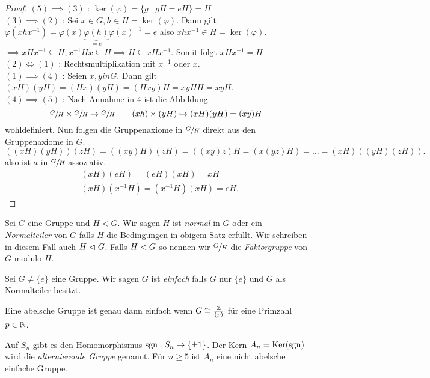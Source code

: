 \begin{proof}
	$(5) \implies (3)$ : $\ker(\varphi) = \{g \mid gH = e H\} = H$ \\
	$(3) \implies (2)$ : Sei $x \in G, h \in H = \ker(\varphi)$.
	Dann gilt $\varphi(x h x^{-1}) = \varphi(x) \underbrace{\varphi(h)}_{= e} \varphi(x)^{-1} = e$ also $x h x^{-1} \in H = \ker(\varphi)$.
	$\implies x H x^{-1} \subseteq H, x^{-1} H x \subseteq H \implies H \subseteq x H x^{-1}$. Somit folgt $x H x^{-1} = H$\\
	$(2) \Leftrightarrow (1)$ : Rechtsmultiplikation mit $x^{-1}$ oder $x$.\\
	$(1) \implies (4)$ : Seien $x,y in G$. Dann gilt $(xH)(yH) = (Hx)(yH) = (Hxy)H = xy H H = xy H$.\\
	$(4) \implies (5)$ : Nach Annahme in $4$ ist die Abbildung 
	\[
		\sfrac{G}{H} \times \sfrac{G}{H} \to \sfrac{G}{H} \qquad (xh) \times (yH) \mapsto (xH)(yH) = (xy) H
	\]
	wohldefiniert. Nun folgen die Gruppenaxiome in $\sfrac{G}{H}$ direkt aus den Gruppenaxiome in $G$.
	\[
		((xH)(yH)) (zH) = ((xy)H)(zH) = ((xy) z) H = (x(yz)H) = \ldots = (xH)((yH)(zH))
	.\] 
	also ist $a$ in $\sfrac{G}{H}$ assoziativ.
	\begin{align*}
		&(xH)(eH) = (eH)(xH) = xH\\
		&(xH)(x^{-1} H) = (x^{-1} H)(xH) = e H
	.\end{align*}
\end{proof}

\begin{definition}
	Sei $G$ eine Gruppe und $H < G$.
	Wir sagen $H$ ist \emph{normal} in $G$ oder ein \emph{Normalteiler} von $G$ falls $H$ die Bedingungen in obigem Satz erfüllt.
	Wir schreiben in diesem Fall auch $H \vartriangleleft G$.
	Falls $H \vartriangleleft G$ so nennen wir $\sfrac{G}{H}$ die \emph{Faktorgruppe} von $G$ modulo $H$.
\end{definition}

\begin{definition}
	Sei $G \neq \{e\} $ eine Gruppe. Wir sagen $ G$ ist \emph{einfach} falls $G$ nur $\{e\} $ und $G$ als Normalteiler besitzt.
\end{definition}

\begin{eg}
	Eine abelsche Gruppe ist genau dann einfach wenn $G \cong \frac{\mathbb{Z}}{(p)}$ für eine Primzahl $p \in \mathbb{N}$.
\end{eg}

\begin{eg}
	Auf $S_{n}$ gibt es den Homomorphismus $\operatorname{sgn}: S_{n} \to \{\pm 1\} $. Der Kern $A_{n} = \operatorname{Ker}(\operatorname{sgn})$ wird die \emph{alternierende Gruppe} genannt.
	Für $n \geq 5$ ist $A_{n}$ eine nicht abelsche einfache Gruppe.
\end{eg}

